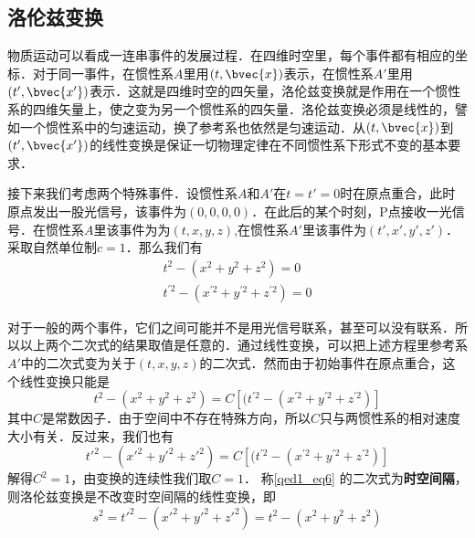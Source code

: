 

\subsection{洛伦兹变换}
物质运动可以看成一连串事件的发展过程．在四维时空里，每个事件都有相应的坐标．对于同一事件，在惯性系$A$里用$(t, \bvec{x})$表示，在惯性系$A'$里用$(t', \bvec{x'})$表示．这就是四维时空的四矢量，洛伦兹变换就是作用在一个惯性系的四维矢量上，使之变为另一个惯性系的四矢量．洛伦兹变换必须是线性的，譬如一个惯性系中的匀速运动，换了参考系也依然是匀速运动．从$(t, \bvec{x})$到$(t', \bvec{x'})$的线性变换是保证一切物理定律在不同惯性系下形式不变的基本要求．

接下来我们考虑两个特殊事件．设惯性系$A$和$A'$在$t=t'=0$时在原点重合，此时原点发出一股光信号，该事件为$(0,0,0,0)$．在此后的某个时刻，P点接收一光信号．在惯性系$A$里该事件为为$(t,x,y,z)$,在惯性系$A'$里该事件为$(t',x',y',z')$．采取自然单位制$c=1$．那么我们有
\begin{equation}\label{qed1_eq6}
\begin{array}{c}
t^{2}-(x^{2}+y^{2}+z^{2})=0 \\
t^{\prime 2}-(x^{\prime 2}+y^{\prime 2}+z^{\prime 2})=0
\end{array}
\end{equation}

对于一般的两个事件，它们之间可能并不是用光信号联系，甚至可以没有联系．所以以上两个二次式的结果取值是任意的．通过线性变换，可以把上述方程里参考系$A'$中的二次式变为关于$(t,x,y,z)$的二次式．然而由于初始事件在原点重合，这个线性变换只能是
\begin{equation}
t^{2}-(x^{2}+y^{2}+z^{2})=C\left[(t^{\prime 2}-(x^{\prime 2}+y^{\prime 2}+z^{\prime 2})\right]
\end{equation}
其中$C$是常数因子．由于空间中不存在特殊方向，所以$C$只与两惯性系的相对速度大小有关．反过来，我们也有
\begin{equation}
t'^{2}-(x'^{2}+y'^{2}+z'^{2})=C\left[(t^{\prime 2}-(x^{\prime 2}+y^{\prime 2}+z^{\prime 2})\right]
\end{equation}
解得$C^2=1$，由变换的连续性我们取$C=1$．
称\autoref{qed1_eq6} 的二次式为\textbf{时空间隔}，则洛伦兹变换是不改变时空间隔的线性变换，即
\begin{equation}
s^2=t'^{2}-(x'^{2}+y'^{2}+z'^{2})=t^{2}-(x^{2}+y^{2}+z^{2})
\end{equation}


